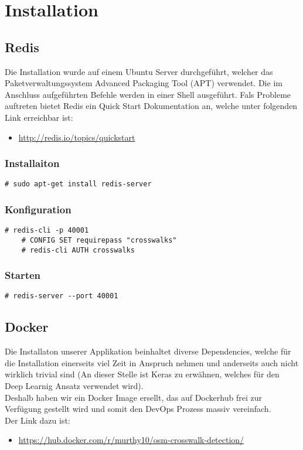 \newpage
\section{Installation}
\subsection{Redis}
\label{subsec:redis}
Die Installation wurde auf einem Ubuntu Server durchgeführt, welcher das Paketverwaltungssystem Advanced Packaging Tool (APT) verwendet. Die im Anschluss aufgeführten Befehle werden in einer Shell ausgeführt.
Fals Probleme auftreten bietet Redis ein Quick Start Dokumentation an, welche unter  folgenden Link erreichbar ist:
\begin{itemize}
	\item \url{http://redis.io/topics/quickstart}
\end{itemize}

\subsubsection{Installaiton}
\begin{lstlisting}[style=BashInputStyle]
	# sudo apt-get install redis-server
\end{lstlisting}

\subsubsection{Konfiguration}
\begin{lstlisting}[style=BashInputStyle]
	# redis-cli -p 40001
	# CONFIG SET requirepass "crosswalks"
	# redis-cli AUTH crosswalks
\end{lstlisting}

\subsubsection{Starten}
\begin{lstlisting}[style=BashInputStyle]
	# redis-server --port 40001
\end{lstlisting}

\newpage

\subsection{Docker}
\label{subsec:docker}
Die Installaton unserer Applikation beinhaltet diverse Dependencies, welche für die Installation einerseits viel Zeit in Anspruch nehmen und anderseits auch nicht wirklich trivial sind (An dieser Stelle ist Keras zu erwähnen, welches für den Deep Learnig Ansatz verwendet wird). \\
Deshalb haben wir ein Docker Image ersellt, das auf Dockerhub frei zur Verfügung gestellt wird und somit den DevOps Prozess massiv vereinfach.\\
Der Link dazu ist:
\begin{itemize}
	\item \url{https://hub.docker.com/r/murthy10/osm-crosswalk-detection/}
\end{itemize}

